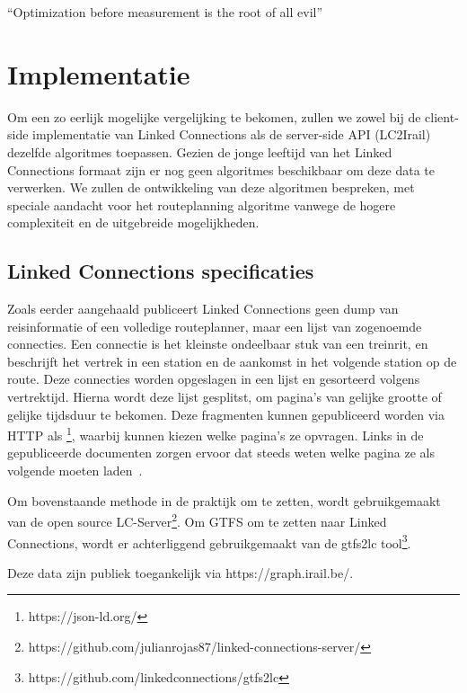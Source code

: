 \begin{savequote}[0.55\linewidth]
	``Optimization before measurement is the root of all evil''
\end{savequote}

\chapter{Implementatie}
\label{chap:implementatie}

Om een zo eerlijk mogelijke vergelijking te bekomen, zullen we zowel bij de client-side implementatie van Linked Connections als de server-side API (LC2Irail) dezelfde algoritmes toepassen. Gezien de jonge leeftijd van het Linked Connections formaat zijn er nog geen algoritmes beschikbaar om deze data te verwerken. We zullen de ontwikkeling van deze algoritmen bespreken, met speciale aandacht voor het routeplanning algoritme vanwege de hogere complexiteit en de uitgebreide mogelijkheden.

\section{Linked Connections specificaties}
\label{sec:lcformaat}
Zoals eerder aangehaald publiceert Linked Connections geen dump van reisinformatie of een volledige routeplanner, maar een lijst van zogenoemde connecties. Een connectie is het kleinste ondeelbaar stuk van een treinrit, en beschrijft het vertrek in een station en de aankomst in het volgende station op de route. Deze connecties worden opgeslagen in een lijst en gesorteerd volgens vertrektijd. Hierna wordt deze lijst gesplitst, om pagina's van gelijke grootte of gelijke tijdsduur te bekomen. Deze fragmenten kunnen gepubliceerd worden via HTTP als \footnote{https://json-ld.org/}, waarbij  kunnen kiezen welke pagina's ze opvragen. Links in de gepubliceerde documenten zorgen ervoor dat  steeds weten welke pagina ze als volgende moeten laden~\citep{linkedconnections18}.

Om bovenstaande methode in de praktijk om te zetten, wordt gebruikgemaakt van de open source LC-Server\footnote{https://github.com/julianrojas87/linked-connections-server/}. Om GTFS om te zetten naar Linked Connections, wordt er achterliggend gebruikgemaakt van de gtfs2lc tool\footnote{https://github.com/linkedconnections/gtfs2lc}.

Deze data zijn publiek toegankelijk via https://graph.irail.be/.

